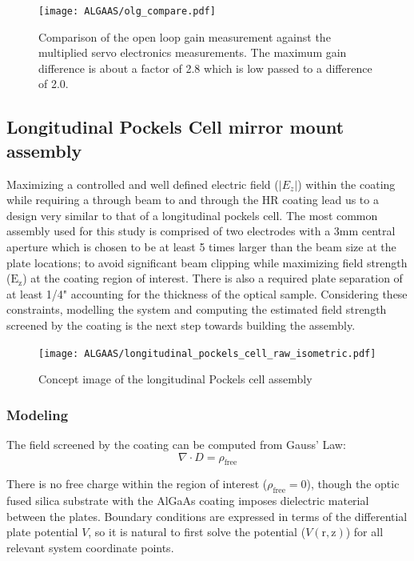 \begin{figure}[H]
\begin{center}
\texttt{[image: ALGAAS/olg\_compare.pdf]}
\end{center}
\caption{Comparison of the open loop gain measurement against the multiplied servo electronics measurements. The maximum gain difference is about a factor of 2.8 which is low passed to a difference of 2.0.}
\label{fig:OLGcompare}
\end{figure}



\subsection{Longitudinal Pockels Cell mirror mount assembly}
Maximizing a controlled and well defined electric field ($|E_z|$) within the coating while requiring a through beam to and through the HR coating lead us to a design very similar to that of a longitudinal pockels cell. The most common assembly used for this study is comprised of two electrodes with a 3mm central aperture which is chosen to be at least 5 times larger than the beam size at the plate locations; to avoid significant beam clipping while maximizing field strength ($\mathrm{E}_\mathrm{z}$) at the coating region of interest. There is also a required plate separation of at least 1/4" accounting for the thickness of the optical sample. Considering these constraints, modelling the system and computing the estimated field strength screened by the coating is the next step towards building the assembly.

\begin{figure}[H]
\begin{center}
\texttt{[image: ALGAAS/longitudinal\_pockels\_cell\_raw\_isometric.pdf]}
\end{center}
\caption{Concept image of the longitudinal Pockels cell assembly}
\label{fig:pckcellconcept}
\end{figure}

\subsubsection*{Modeling}
The field screened by the coating can be computed from Gauss' Law:
\begin{equation}
\nabla \cdot D = \rho_\mathrm{free}
\end{equation}

\noindent There is no free charge within the region of interest ($\rho_\mathrm{free}=0$), though the optic fused silica substrate with the AlGaAs coating imposes dielectric material between the plates. Boundary conditions are expressed in terms of the differential plate potential $V$, so it is natural to first solve the potential ($V(\mathrm{r, z})$) for all relevant system coordinate points.  

